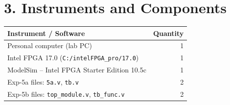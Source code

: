 \section*{3. Instruments and Components}

\begin{table}[H]
\centering
\small
\begin{tabularx}{0.8\textwidth}{X r}
\toprule
\textbf{Instrument / Software} & \textbf{Quantity} \\
\midrule
Personal computer (lab PC) & 1 \\
Intel FPGA 17.0 (\texttt{C:/intelFPGA\_pro/17.0}) & 1 \\
ModelSim -- Intel FPGA Starter Edition 10.5c & 1 \\
Exp-5a files: \texttt{5a.v}, \texttt{tb.v} & 2 \\
Exp-5b files: \texttt{top\_module.v}, \texttt{tb\_func.v} & 2 \\
\bottomrule
\end{tabularx}
\end{table}
